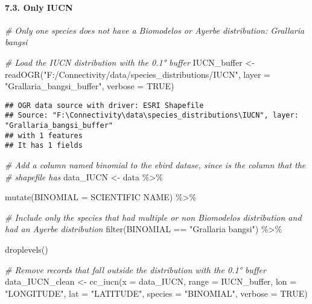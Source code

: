 \documentclass[
]{article}
\newenvironment{Shaded}{\begin{snugshade}}{\end{snugshade}}
\newcommand{\AttributeTok}[1]{\textcolor[rgb]{0.77,0.63,0.00}{#1}}
\newcommand{\CommentTok}[1]{\textcolor[rgb]{0.56,0.35,0.01}{\textit{#1}}}
\newcommand{\ConstantTok}[1]{\textcolor[rgb]{0.00,0.00,0.00}{#1}}
\newcommand{\FunctionTok}[1]{\textcolor[rgb]{0.00,0.00,0.00}{#1}}
\newcommand{\NormalTok}[1]{#1}
\newcommand{\OtherTok}[1]{\textcolor[rgb]{0.56,0.35,0.01}{#1}}
\newcommand{\SpecialCharTok}[1]{\textcolor[rgb]{0.00,0.00,0.00}{#1}}
\newcommand{\StringTok}[1]{\textcolor[rgb]{0.31,0.60,0.02}{#1}}
\begin{document}
\hypertarget{only-iucn}{%
\paragraph{7.3. Only IUCN}\label{only-iucn}}

\begin{Shaded}
\begin{Highlighting}[]
\CommentTok{\# Only one species does not have a Biomodelos or Ayerbe distribution: Grallaria bangsi}

\CommentTok{\# Load the IUCN distribution with the 0.1° buffer}
\NormalTok{IUCN\_buffer }\OtherTok{\textless{}{-}} \FunctionTok{readOGR}\NormalTok{(}\StringTok{"F:/Connectivity/data/species\_distributions/IUCN"}\NormalTok{, }\AttributeTok{layer =} \StringTok{"Grallaria\_bangsi\_buffer"}\NormalTok{, }\AttributeTok{verbose =} \ConstantTok{TRUE}\NormalTok{)}
\end{Highlighting}
\end{Shaded}

\begin{verbatim}
## OGR data source with driver: ESRI Shapefile 
## Source: "F:\Connectivity\data\species_distributions\IUCN", layer: "Grallaria_bangsi_buffer"
## with 1 features
## It has 1 fields
\end{verbatim}

\begin{Shaded}
\begin{Highlighting}[]
\CommentTok{\# Add a column named binomial to the ebird datase, since is the column that the }
\CommentTok{\# shapefile has }
\NormalTok{data\_IUCN }\OtherTok{\textless{}{-}}\NormalTok{ data }\SpecialCharTok{\%\textgreater{}\%} 
  
  \FunctionTok{mutate}\NormalTok{(}\AttributeTok{BINOMIAL =} \StringTok{\textasciigrave{}}\AttributeTok{SCIENTIFIC NAME}\StringTok{\textasciigrave{}}\NormalTok{) }\SpecialCharTok{\%\textgreater{}\%}
  
  \CommentTok{\# Include only the species that had multiple or non Biomodelos distribution and had an Ayerbe distribution}
  \FunctionTok{filter}\NormalTok{(BINOMIAL }\SpecialCharTok{==} \StringTok{"Grallaria bangsi"}\NormalTok{) }\SpecialCharTok{\%\textgreater{}\%}
  
  \FunctionTok{droplevels}\NormalTok{()}

\CommentTok{\# Remove records that fall outside the distribution with the 0.1° buffer }
\NormalTok{data\_IUCN\_clean }\OtherTok{\textless{}{-}} \FunctionTok{cc\_iucn}\NormalTok{(}\AttributeTok{x =}\NormalTok{ data\_IUCN, }
                \AttributeTok{range =}\NormalTok{ IUCN\_buffer, }
                \AttributeTok{lon =} \StringTok{"LONGITUDE"}\NormalTok{, }
                \AttributeTok{lat =} \StringTok{"LATITUDE"}\NormalTok{,}
                \AttributeTok{species =} \StringTok{"BINOMIAL"}\NormalTok{,}
                \AttributeTok{verbose =} \ConstantTok{TRUE}\NormalTok{)}
\end{Highlighting}
\end{Shaded}
\end{document}
